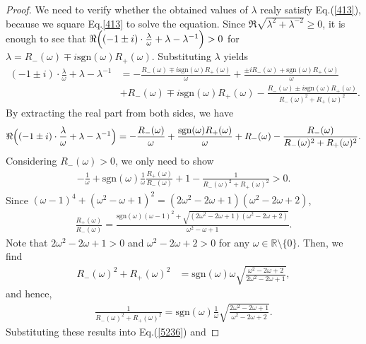 \documentclass[10pt,a4paper]{amsart}
\begin{document}
\begin{proof}
We need to verify whether the obtained values of $\lambda$ realy satisfy Eq.(\ref{413}), 
because we square Eq.\eqref{413} to solve the equation. Since $\Re \sqrt{\lambda^2 +\lambda^{-2}} \ge 0$, it is enough to see that $\Re \Bigl( (-1\pm i) \cdot \frac{\lambda}{\omega}+\lambda -\lambda^{-1} \Bigr) > 0$ for $\lambda = R_-(\omega) \mp i\mathrm{sgn}(\omega) R_+(\omega)$. 
Substituting $\lambda$ yields 
\begin{align*}
    (-1 \pm i) \cdot \frac{\lambda}{\omega} +\lambda -\lambda^{-1} &= -\frac{R_-(\omega)\mp i\mathrm{sgn}(\omega)R_+(\omega)}{\omega} + \frac{\pm iR_-(\omega) + \mathrm{sgn}(\omega)R_+(\omega)}{\omega}\\
    &+R_-(\omega)\mp i\mathrm{sgn}(\omega)R_+(\omega)-\frac{R_-(\omega)\pm i\mathrm{sgn}(\omega)R_+(\omega)}{R_-(\omega)^2 +R_+(\omega)^2}.
\end{align*}
By extracting the real part from both sides, we have
\begin{align*}
    \Re \Bigl( (-1\pm i) \cdot \frac{\lambda}{\omega} +\lambda -\lambda^{-1} \Bigr) =-\frac{R_-(\omega)}{\omega}+\frac{\mathrm{sgn}(\omega)R_+(\omega)}{\omega}+R_-(\omega) -\frac{R_-(\omega)}{R_-(\omega)^2+R_+(\omega)^2}.
\end{align*}
Considering $R_-(\omega) >0$, we only need to show
\begin{align}
    -\frac{1}{\omega}+ \mathrm{sgn}(\omega)\frac{1}{\omega}\frac{R_+(\omega)}{R_-(\omega)}+1 - \frac{1}{R_-(\omega)^2+R_+(\omega)^2} > 0. \label{5236}
\end{align}
Since $(\omega -1)^4+(\omega^2-\omega+1)^2=(2\omega^2-2\omega+1)(\omega^2-2\omega+2)$,
\begin{align*}
    \frac{R_+(\omega)}{R_-(\omega)} = \frac{\mathrm{sgn}(\omega)(\omega -1)^2 +\sqrt{(2\omega ^2 -2\omega +1)(\omega ^2 -2\omega +2)}}{\omega^2 -\omega +1}.
\end{align*}
Note that $2\omega^2 - 2\omega + 1 > 0$ and $\omega^2 - 2\omega + 2 > 0$ for any $\omega \in \mathbb{R} \setminus \{0\}$. Then, we find
\begin{align*}
R_-(\omega)^2+R_+(\omega)^2 &= \mathrm{sgn}(\omega) \omega \sqrt{\frac{\omega^2-2\omega +2}{2\omega^2 -2\omega +1}},
\end{align*}
and hence,
\begin{align*}
    \frac{1}{R_-(\omega)^2+R_+(\omega)^2} =\mathrm{sgn}(\omega)\frac{1}{\omega}\sqrt{\frac{2\omega^2 -2\omega +1}{\omega^2 -2\omega +2}}.
\end{align*}
Substituting these results into Eq.(\ref{5236}) and

\end{proof}
\end{document}
